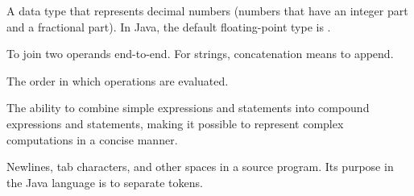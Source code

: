 \begin{description}

A data type that represents decimal numbers (numbers that have an integer
part and a fractional part).
In Java, the default floating-point type is .

To join two operands end-to-end.
For strings, concatenation means to append.

The order in which operations are evaluated.

The ability to combine simple expressions and statements into compound expressions and statements, making it possible to represent complex computations in a concise manner.

Newlines, tab characters, and other spaces in a source program.
Its purpose in the Java language is to separate tokens.


\end{description}
